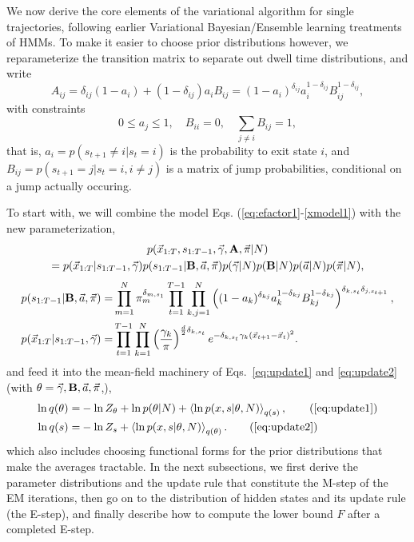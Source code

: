 We now derive the core elements of the variational algorithm for
single trajectories, following earlier Variational Bayesian/Ensemble
learning treatments of
HMMs\cite{Bronson2010,Mackay1997,Beal2003}.  To make it
easier to choose prior distributions however, we reparameterize the
transition matrix to separate out dwell time distributions, and write
\begin{equation}\label{eq:aBdef}
A_{ij}=\delta_{ij}(1-a_i)+(1-\delta_{ij})a_iB_{ij}=
(1-a_i)^{\delta_{ij}}a_i^{1-\delta_{ij}}B_{ij}^{1-\delta_{ij}},
\end{equation}
with constraints
\begin{equation}
0\le a_j\le 1,\quad B_{ii}=0,\quad \sum_{j\ne i}B_{ij}=1,
\end{equation}
that is, $a_i=p(s_{t+1}\ne i|s_t=i)$ is the probability to exit state $i$, and
$B_{ij}=p(s_{t+1}=j|s_t=i,i\ne j)$ is a matrix of jump probabilities,
conditional on a jump actually occuring.


To start with, we will combine the model
Eqs. (\ref{eq:efactor1}-\ref{xmodel1}) with the new parameterization,
\begin{multline}
\label{eq:efactor1b}
p(\vec{x}_{1:T},s_{1:T-1},\vec{\gamma},\mathbf{A},\vec\pi|N)\\
=p(\vec{x}_{1:T}|s_{1:T-1},\vec{\gamma})
p(s_{1:T-1}|\mathbf{B},\vec{a},\vec\pi)
p(\vec{\gamma}|N)p(\mathbf{B}|N)p(\vec{a}|N)p(\vec\pi|N),
\end{multline}
\begin{align}
\label{smodel1b}
  p(s_{1:T-1}|\mathbf{B},\vec a,\vec{\pi})=&
  \prod_{m=1}^N\pi_m^{\delta_{m,s_1}}
  \prod_{t=1}^{T-1}\prod_{k,j=1}^N 
  \left((1-a_k)^{\delta_{kj}}a_k^{1-\delta_{kj}}
  B_{kj}^{1-\delta_{kj}}\right)^{\delta_{k,s_t}\delta_{j,s_{t+1}}},\\
    \label{xmodel1b}
    p(\vec{x}_{1:T}|s_{1:T-1},\vec\gamma)=&
    \prod_{t=1}^{T-1}\prod_{k=1}^N\left(
    \frac{\gamma_k}{\pi}\right)^{\frac d2\delta_{k,s_t}}
    e^{-\delta_{k,s_t}\gamma_k(\vec{x}_{t+1}-\vec{x}_t)^2}. 
\end{align}
and feed it into the mean-field machinery of Eqs.~\eqref{eq:update1}
and \eqref{eq:update2} (with
$\theta=\vec{\gamma},\mathbf{B},\vec{a},\vec{\pi}$,),
\begin{align}
  \ln q(\theta)=&-\ln Z_\theta+\ln p(\theta|N)
  +\mean{\ln p(x,s|\theta,N)}_{q(s)},\tag{\ref{eq:update1}}\\
  \ln q(s)=&-\ln Z_s+\mean{\ln p(x,s|\theta,N)}_{q(\theta)}.
\tag{\ref{eq:update2}}
\end{align}
which also includes choosing functional forms for the prior
distributions that make the averages tractable. In the next
subsections, we first derive the parameter distributions and the
update rule that constitute the M-step of the EM iterations, then go on
to the distribution of hidden states and its update rule (the E-step),
and finally describe how to compute the lower bound $F$ after a
completed E-step.

